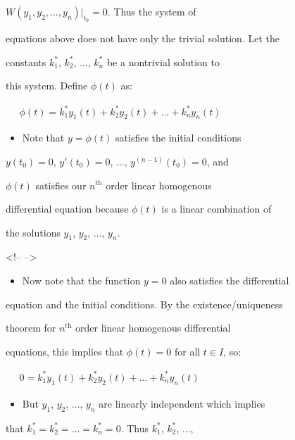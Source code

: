     $W(y_1, y_2, ..., y_n)  \bigg|_{t_0} = 0$. Thus the system of

    equations above does not have only the trivial solution. Let the

    constants $k_1^*$, $k_2^*$, ..., $k_n^*$ be a nontrivial solution to

    this system. Define $\phi(t)$ as:



$\begin{aligned} \quad \phi(t) = k_1^* y_1(t) + k_2^* y_2(t) + ... + k_n^* y_n(t) \end{aligned}$



\begin{itemize}
    \item Note that $y = \phi(t)$ satisfies the initial conditions
\end{itemize}
    $y(t_0) = 0$, $y'(t_0) = 0$, ..., $y^{(n-1)} (t_0) = 0$, and

    $\phi(t)$ satisfies our $n^{\mathrm{th}}$ order linear homogenous

    differential equation because $\phi(t)$ is a linear combination of

    the solutions $y_1$, $y_2$, ..., $y_n$.



<!-- -->



\begin{itemize}
    \item Now note that the function $y = 0$ also satisfies the differential
\end{itemize}
    equation and the initial conditions. By the existence/uniqueness

    theorem for $n^{\mathrm{th}}$ order linear homogenous differential

    equations, this implies that $\phi(t) = 0$ for all $t \in I$, so:



$\begin{aligned} \quad 0 = k_1^* y_1(t) + k_2^* y_2(t) + ... + k_n^* y_n(t) \end{aligned}$



\begin{itemize}
    \item But $y_1$, $y_2$, ..., $y_n$ are linearly independent which implies
\end{itemize}
    that $k_1^* = k_2^* = ... = k_n^* = 0$. Thus $k_1^*$, $k_2^*$, ...,

